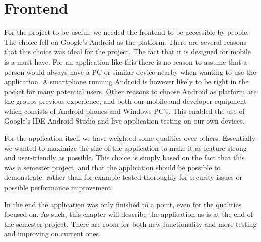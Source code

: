 \chapter{Frontend}
\label{chap:frontend}

For the project to be useful, we needed the frontend to be accessible by people. The choice fell on Google's Android as the platform. There are several reasons that this choice was ideal for the project. The fact that it is designed for mobile is a must have. For an application like this there is no reason to assume that a person would always have a PC or similar device nearby when wanting to use the application. A smartphone running Android is however likely to be right in the pocket for many potential users. Other reasons to choose Android as platform are the groups previous experience, and both our mobile and developer equipment which consists of Android phones and Windows PC's. This enabled the use of Google's IDE Android Studio and live application testing on our own devices.

For the application itself we have weighted some qualities over others. Essentially we wanted to maximize the size of the application to make it as feature-strong and user-friendly as possible. This choice is simply based on the fact that this was a semester project, and that the application should be possible to demonstrate, rather than for example tested thoroughly for security issues or possible performance improvement.

In the end the application was only finished to a point, even for the qualities focused on. As such, this chapter will describe the application as-is at the end of the semester project. There are room for both new functionality and more testing and improving on current ones.



